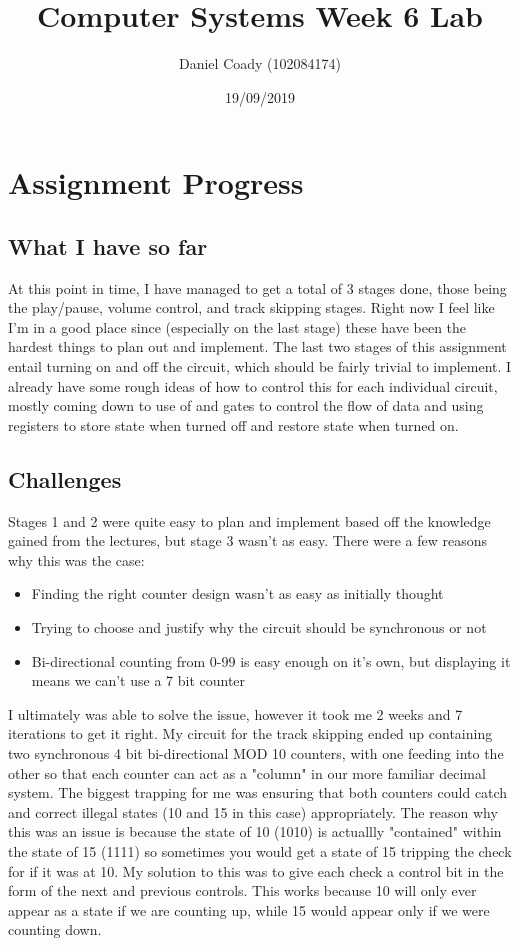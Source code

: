 \documentclass[11pt]{scrartcl}
\title{Computer Systems Week 6 Lab}
\author{Daniel Coady (102084174)}
\date{19/09/2019}
\begin{document}
\maketitle

\section*{Assignment Progress}
\subsection*{What I have so far}
At this point in time, I have managed to get a total of 3 stages done, those being the
play/pause, volume control, and track skipping stages. Right now I feel like I'm in a good
place since (especially on the last stage) these have been the hardest things to plan
out and implement. The last two stages of this assignment entail turning on and off the
circuit, which should be fairly trivial to implement. I already have some rough ideas
of how to control this for each individual circuit, mostly coming down to use of and
gates to control the flow of data and using registers to store state when turned off and
restore state when turned on.

\subsection*{Challenges}
Stages 1 and 2 were quite easy to plan and implement based off the knowledge gained from
the lectures, but stage 3 wasn't as easy. There were a few reasons why this was the case:
\begin{itemize}
    \item Finding the right counter design wasn't as easy as initially thought
    \item Trying to choose and justify why the circuit should be synchronous or not
    \item Bi-directional counting from 0-99 is easy enough on it's own, but displaying it means we can't use a 7 bit counter
\end{itemize}
I ultimately was able to solve the issue, however it took me 2 weeks and 7 iterations to
get it right. My circuit for the track skipping ended up containing two synchronous
4 bit bi-directional MOD 10 counters, with one feeding into the other so that each counter
can act as a "column" in our more familiar decimal system. The biggest trapping for me was
ensuring that both counters could catch and correct illegal states (10 and 15 in this
case) appropriately. The reason why this was an issue is because the state of 10 (1010) is
actuallly "contained" within the state of 15 (1111) so sometimes you would get a state of
15 tripping the check for if it was at 10. My solution to this was to give each check a
control bit in the form of the next and previous controls. This works because 10 will only
ever appear as a state if we are counting up, while 15 would appear only if we were
counting down.
\end{document}
